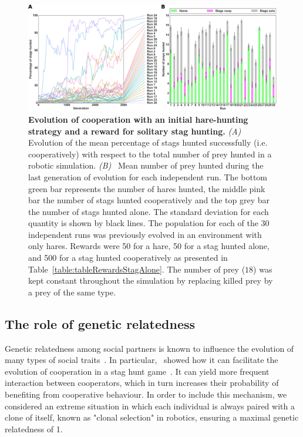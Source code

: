     \begin{figure}[h]
      \centerfloat
        \includegraphics[scale = 1.0]{fig/ArticleBio1/Fig6.png}
      \caption{\textbf{Evolution of cooperation with an initial hare-hunting strategy and a reward for solitary stag hunting.}
      {\em (A)}~ Evolution of the mean percentage of stags hunted successfully (i.e. cooperatively) with respect to the total number of prey hunted in a robotic simulation. {\em (B)}~ Mean number of prey hunted during the last generation of evolution for each independent run. The bottom green bar represents the number of hares hunted, the middle pink bar the number of stags hunted cooperatively and the top grey bar the number of stags hunted alone. The standard deviation for each quantity is shown by black lines. The population for each of the 30 independent runs was previously evolved in an environment with only hares. Rewards were 50 for a hare, 50 for a stag hunted alone, and 500 for a stag hunted cooperatively as presented in Table~\ref{table:tableRewardsStagAlone}. The number of prey ($18$) was kept constant throughout the simulation by replacing killed prey by a prey of the same type.}
      \label{fig:graphSolo}
    \end{figure}


  \subsection{The role of genetic relatedness}
    Genetic relatedness among social partners is known to influence the evolution of many types of social traits~\parencite{Hamilton1964}. In particular,~\parencite{Skyrms2004} showed how it can facilitate the evolution of cooperation in a stag hunt game~\parencite[chapter 3]{Skyrms2004}. It can yield more frequent interaction between cooperators, which in turn increases their probability of benefiting from cooperative behaviour. In order to include this mechanism, we considered an extreme situation in which each individual is always paired with a clone of itself, known as "clonal selection" in robotics, ensuring a maximal genetic relatedness of 1.

